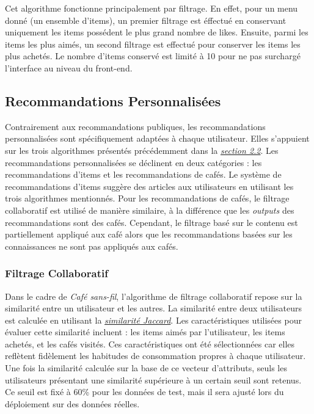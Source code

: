 \documentclass[11pt]{article}
\begin{document}
Cet algorithme fonctionne principalement par filtrage. En effet, pour un menu donné (un ensemble d'items), un premier filtrage est éffectué en conservant uniquement les items possédent le plus grand nombre de likes. Ensuite, parmi les items les plus aimés, un second filtrage est effectué pour conserver les items les plus achetés. Le nombre d'items conservé est limité à 10 pour ne pas surchargé l'interface au niveau du front-end.

\subsection{Recommandations Personnalisées}
Contrairement aux recommandations publiques, les recommandations personnalisées sont spécifiquement adaptées à chaque utilisateur. Elles s’appuient sur les trois algorithmes présentés précédemment dans la \hyperref[2.2]{\textit{section 2.2}}. Les recommandations personnalisées se déclinent en deux catégories : les recommandations d'items et les recommandations de cafés. Le système de recommandations d'items suggère des articles aux utilisateurs en utilisant les trois algorithmes mentionnés. Pour les recommandations de cafés, le filtrage collaboratif est utilisé de manière similaire, à la différence que les \textit{outputs} des recommandations sont des cafés. Cependant, le filtrage basé sur le contenu est partiellement appliqué aux café alors que les recommandations basées sur les connaissances ne sont pas appliqués aux cafés.

\subsubsection{Filtrage Collaboratif}
Dans le cadre de \textit{Café sans-fil}, l'algorithme de filtrage collaboratif repose sur la similarité entre un utilisateur et les autres. La similarité entre deux utilisateurs est calculée en utilisant la \hyperref[jaccard]{\textit{similarité Jaccard}}. Les caractéristiques utilisées pour évaluer cette similarité incluent : les items aimés par l'utilisateur, les items achetés, et les cafés visités. Ces caractéristiques ont été sélectionnées car elles reflètent fidèlement les habitudes de consommation propres à chaque utilisateur. Une fois la similarité calculée sur la base de ce vecteur d'attributs, seuls les utilisateurs présentant une similarité supérieure à un certain seuil sont retenus. Ce seuil est fixé à 60\% pour les données de test, mais il sera ajusté lors du déploiement sur des données réelles.\
\end{document}
